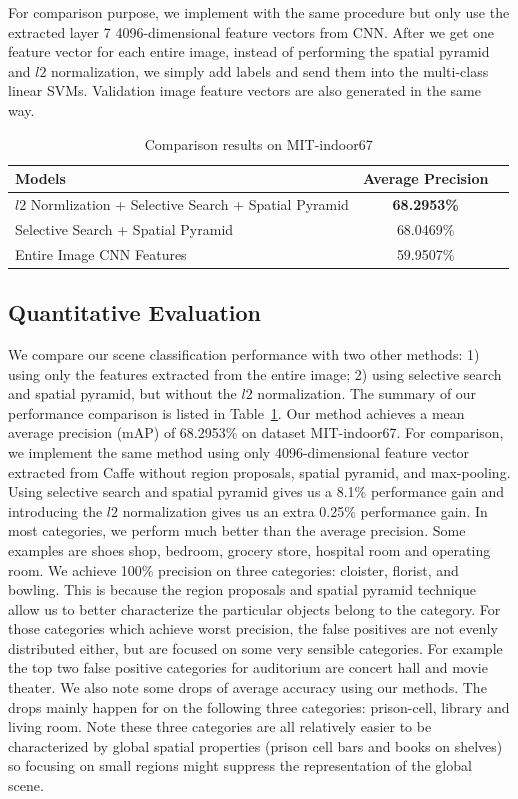 For comparison purpose, we implement with the same procedure but only use
the extracted layer 7 4096-dimensional feature vectors from CNN. After we get
one feature vector for each entire image, instead of performing the spatial
pyramid and $l2$ normalization, we simply add labels and send them into the
multi-class linear SVMs. Validation image feature vectors are also generated
in the same way.

\begin{table}[ht]
        \caption{Comparison results on MIT-indoor67}
        \centering
        \begin{tabular}{l c c}
        \hline \hline
        Models                & Average Precision \\ \hline
        $l2$ Normlization + Selective Search + Spatial Pyramid & {\bf{68.2953\%}} \\
        Selective Search + Spatial Pyramid & 68.0469\% \\
        Entire Image CNN Features & 59.9507\% \\
        \hline
        \end{tabular}
        \label{tab:overall}
\end{table}

\subsection{Quantitative Evaluation}
We compare our scene classification performance with two other methods: 1) using only the
features extracted from the entire image; 2) using selective search and spatial pyramid, but without the
$l2$ normalization. The summary of our performance comparison is listed in Table~\ref{tab:overall}.
Our method achieves a mean average precision (mAP) of 68.2953\% on dataset
MIT-indoor67. For comparison, we implement the same method using only 4096-dimensional
feature vector extracted from Caffe without region proposals, spatial pyramid, and max-pooling.
Using selective search and spatial pyramid gives us a 8.1\% performance gain and introducing
the $l2$ normalization gives us an extra 0.25\% performance gain. In most categories, we perform much
better than the average precision. Some examples are shoes shop, bedroom, grocery store, hospital room and operating
room. We achieve 100\% precision on three categories: cloister, florist, and bowling. This is because the region proposals and spatial pyramid technique
allow us to better characterize the particular objects belong to the category. For those categories which achieve worst precision, the false positives are
not evenly distributed either, but are focused on some very sensible categories. For example the top two false positive categories for auditorium are concert hall
and movie theater.
We also note some drops of average accuracy using our methods. The drops mainly happen for on the following three categories: prison-cell, library and living room.
Note these three categories are all relatively easier to be characterized by global spatial properties (prison cell bars and books on shelves) so focusing on small regions
might suppress the representation of the global scene.


